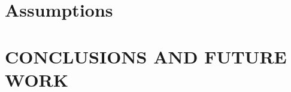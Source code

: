 \section{Assumptions}
\label{sect:Assumptions}


\addtolength{\textheight}{-15cm}   %


\section{CONCLUSIONS AND FUTURE WORK}
\label{sect:Conclusions}





